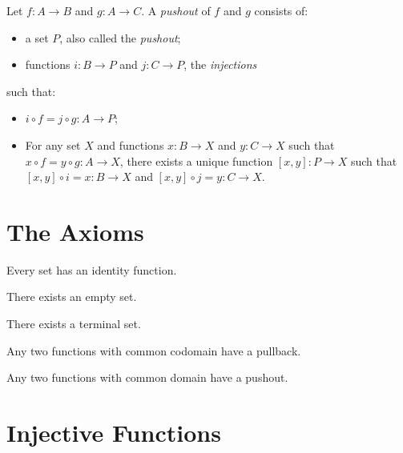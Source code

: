 \begin{df}[Pushout]
  Let $f : A \rightarrow B$ and $g : A \rightarrow C$. A \emph{pushout} of $f$ and $g$ consists of:
  \begin{itemize}
    \item a set $P$, also called the \emph{pushout};
    \item functions $i : B \rightarrow P$ and $j : C \rightarrow P$, the \emph{injections}
  \end{itemize}
  such that:
  \begin{itemize}
    \item $i \circ f = j \circ g : A \rightarrow P$;
    \item For any set $X$ and functions $x : B \rightarrow X$ and $y : C \rightarrow X$ such that $x \circ f = y \circ g : A \rightarrow X$, there exists a unique function
    $[x,y] : P \rightarrow X$ such that $[x,y] \circ i = x : B \rightarrow X$ and $[x,y] \circ j = y : C \rightarrow X$.
  \end{itemize}
\end{df}

\section{The Axioms}

\begin{ax}
  Every set has an identity function.
\end{ax}

\begin{ax}
  There exists an empty set.
\end{ax}

\begin{ax}
  There exists a terminal set.
\end{ax}

\begin{ax}
  Any two functions with common codomain have a pullback.
\end{ax}

\begin{ax}
  Any two functions with common domain have a pushout.
\end{ax}

\section{Injective Functions}

